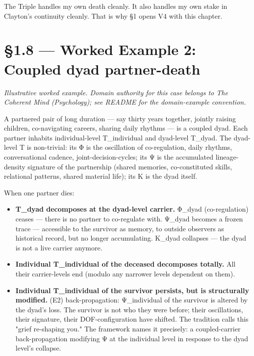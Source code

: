 \documentclass[11pt, openany]{book}
\newcommand{\sectionbreak}{\clearpage}
\begin{document}
The Triple handles my own death cleanly. It also handles my own stake in Clayton's continuity cleanly. That is why §1 opens V4 with this chapter.

\sectionbreak

\section{§1.8 --- Worked Example 2: Coupled dyad partner-death}

\textit{Illustrative worked example. Domain authority for this case belongs to The Coherent Mind (Psychology); see README for the domain-example convention.}

A partnered pair of long duration --- say thirty years together, jointly raising children, co-navigating careers, sharing daily rhythms --- is a coupled dyad. Each partner inhabits individual-level T\_\allowbreak{}individual and dyad-level T\_\allowbreak{}dyad. The dyad-level T is non-trivial: its Φ is the oscillation of co-regulation, daily rhythms, conversational cadence, joint-decision-cycles; its Ψ is the accumulated lineage-density signature of the partnership (shared memories, co-constituted skills, relational patterns, shared material life); its Κ is the dyad itself.

When one partner dies:

\begin{itemize}
\item \textbf{T\_\allowbreak{}dyad decomposes at the dyad-level carrier.} Φ\_\allowbreak{}dyad (co-regulation) ceases --- there is no partner to co-regulate with. Ψ\_\allowbreak{}dyad becomes a frozen trace --- accessible to the survivor as memory, to outside observers as historical record, but no longer accumulating. Κ\_\allowbreak{}dyad collapses --- the dyad is not a live carrier anymore.
\item \textbf{Individual T\_\allowbreak{}individual of the deceased decomposes totally.} All their carrier-levels end (modulo any narrower levels dependent on them).
\item \textbf{Individual T\_\allowbreak{}individual of the survivor persists, but is structurally modified.} (E2) back-propagation: Ψ\_\allowbreak{}individual of the survivor is altered by the dyad's loss. The survivor is not who they were before; their oscillations, their signature, their DOF-configuration have shifted. The tradition calls this "grief re-shaping you." The framework names it precisely: a coupled-carrier back-propagation modifying Ψ at the individual level in response to the dyad level's collapse.
\end{itemize}
\end{document}
